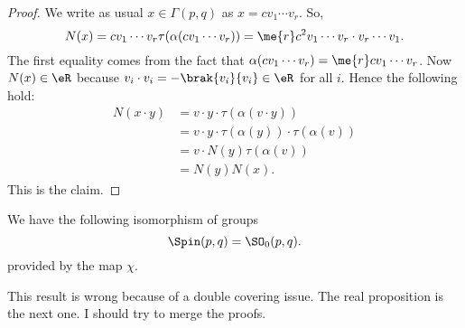 \begin{proof}
We write as usual $x\in\Gamma(p,q)$ as $x=cv_1\cdots v_r$. So,
\begin{equation}
 N(x)=cv_1\cdots v_r\tau(\alpha(cv_1\cdots v_r))
     =\me{r}c^2v_1\cdots v_r\cdot v_r\cdots v_1.
\end{equation}
The first equality comes from the fact that $\alpha(cv_1\cdots v_r)=\me{r}cv_1\cdots v_r$. Now $N(x)\in\eR$ because $v_i\cdot v_i=-\brak{v_i}{v_i}\in\eR$ for all $i$. Hence the following hold:
\begin{equation}
\begin{split}
 N(x\cdot y)&=v\cdot y\cdot\tau(\alpha(v\cdot y))\\
            &=v\cdot y\cdot\tau(\alpha(y))\cdot\tau(\alpha(v))\\
            &=v\cdot N(y)\tau(\alpha(v))\\
            &=N(y)N(x).
\end{split}
\end{equation}
This is the claim.
\end{proof}


\begin{theorem}
We have the following isomorphism of groups
\[ 
  \Spin(p,q)=\SO_0(p,q).
\]
provided by the map $\chi$.
\end{theorem}

\begin{probleme}
	This result is wrong because of a double covering issue. The real proposition is the next one. I should try to merge the proofs.
\end{probleme}


